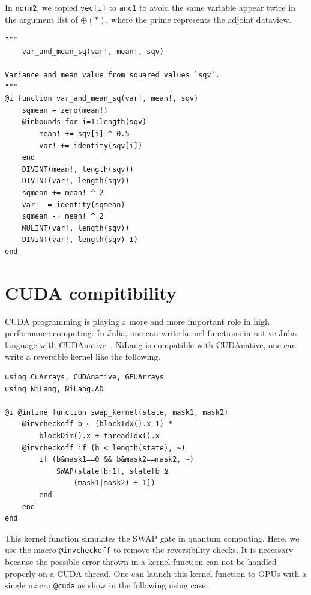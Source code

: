 \documentclass[aps,twocolumn,longbibliography,english,superscriptaddress]{revtex4-1}
\newcommand{\<}{\langle}
\renewcommand{\>}{\rangle}
\theoremstyle{definition}\newtheorem{definition}{\textit{Definition}}
\begin{document}
In \texttt{norm2}, we copied \texttt{vec[i]\textquotesingle} to \texttt{anc1} to avoid the same variable appear twice in the argument list of $\oplus(*)$, where the prime represents the adjoint dataview.

\begin{minipage}{.44\textwidth}
\begin{lstlisting}
"""
    var_and_mean_sq(var!, mean!, sqv)

Variance and mean value from squared values `sqv`.
"""
@i function var_and_mean_sq(var!, mean!, sqv)
    sqmean ← zero(mean!)
    @inbounds for i=1:length(sqv)
        mean! += sqv[i] ^ 0.5
        var! += identity(sqv[i])
    end
    DIVINT(mean!, length(sqv))
    DIVINT(var!, length(sqv))
    sqmean += mean! ^ 2
    var! -= identity(sqmean)
    sqmean -= mean! ^ 2
    MULINT(var!, length(sqv))
    DIVINT(var!, length(sqv)-1)
end
\end{lstlisting}
\end{minipage}

\section{CUDA compitibility}\label{app:cuda}
CUDA programming is playing a more and more important role in high performance computing. In Julia, one can write kernel functions in native Julia language with CUDAnative~\cite{Besard2018}.
NiLang is compatible with CUDAnative, one can write a reversible kernel like the following.

\begin{minipage}{.44\textwidth}
\begin{lstlisting}
using CuArrays, CUDAnative, GPUArrays
using NiLang, NiLang.AD

@i @inline function swap_kernel(state, mask1, mask2)
    @invcheckoff b ← (blockIdx().x-1) * 
        blockDim().x + threadIdx().x
    @invcheckoff if (b < length(state), ~)
        if (b&mask1==0 && b&mask2==mask2, ~)
            SWAP(state[b+1], state[b ⊻ 
                (mask1|mask2) + 1])
        end
    end
end
\end{lstlisting}
\end{minipage}

This kernel function simulates the SWAP gate in quantum computing.
Here, we use the macro \texttt{@invcheckoff} to remove the reversibility checks.
It is necessary because the possible error thrown in a kernel function can not be handled properly on a CUDA thread.
One can launch this kernel function to GPUs with a single macro \texttt{@cuda} as show in the following using case.
\end{document}
